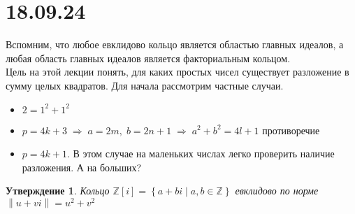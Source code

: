 \documentclass[12pt, a4paper]{article}
\newcommand{\ra}{\;\Rightarrow\;}
\newcommand{\Z}{\mathds{Z}}
\newcommand{\norm}[1]{\left \lVert #1 \right \rVert}
\theoremstyle{plain}
\newtheorem*{Statement*}{Утверждение}
\theoremstyle{definition}
\begin{document}
\section*{18.09.24}
\hypertarget{p5}{}
Вспомним, что любое евклидово кольцо является областью главных идеалов, а любая область главных идеалов является факториальным кольцом.\\
Цель на этой лекции понять, для каких простых чисел существует разложение в сумму целых квадратов. Для начала рассмотрим частные случаи.

\begin{itemize}
    \item $2 = 1^2+1^2$
    \item $p = 4k+3 \ra a = 2m,\; b = 2n+1 \ra a^2+b^2 = 4l+1$ противоречие
    \item $p = 4k+1$. В этом случае на маленьких числах легко проверить наличие разложения. А на больших?
\end{itemize}
\begin{Statement*}
    Кольцо $\Z[i] = \left\{a+bi\;|\;a,b\in\Z\right\}$ евклидово по норме $\norm{u+vi} = u^2+v^2$
\end{Statement*}
\end{document}
